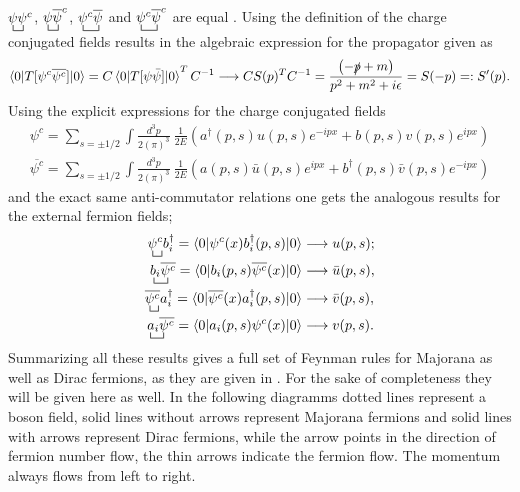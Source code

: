 $\bcontraction{}{\psi}{}{\psi}\psi \psi^c$, $\bcontraction{}{\psi}{}{\psi}\psi \overline{\psi}^c$, $\bcontraction{}{\psi}{^c}{\psi}\psi^c \overline{\psi}$ and $\bcontraction{}{\psi}{^c}{\psi}\psi^c \overline{\psi}^c$ are equal \cite[p. 473]{Denner:1992vza}.
Using the definition of the charge conjugated fields results in the algebraic expression for the propagator given as \cite[Eq. (2.15)]{Denner:1992vza}
\begin{equation*}
	\braket{0|T[\psi^c\overline{\psi^c}]|0}=C\braket{0|T[\psi\bar{\psi}]|0}^TC^{-1}\longrightarrow CS(p)^TC^{-1}=\frac{\left(-\slashed p+m\right)}{p^2+m^2+i\epsilon}=S(-p)=:S'(p).
\end{equation*}
Using the explicit expressions for the charge conjugated fields
\begin{align*}
\psi^c=\sum_{s=\pm1/2}\int \frac{d^3p}{2(\pi)^3}\:\frac{1}{2E}\left(a^\dagger(p,s)u(p,s)e^{-ipx}+b(p,s)v(p,s)e^{ipx}\right)\\
\overline{\psi^c}=\sum_{s=\pm1/2}\int \frac{d^3p}{2(\pi)^3}\:\frac{1}{2E}\left(a(p,s)\bar{u}(p,s)e^{ipx}+b^\dagger(p,s)\bar{v}(p,s)e^{-ipx}\right)
\end{align*}
 and the exact same anti-commutator relations one gets the analogous results for the external fermion fields;
\begin{align*}
\bcontraction{}{\psi}{}{a}\psi^c b_i^\dagger=\braket{0|\psi^c(x) b_i^\dagger(p,s)|0}&\longrightarrow u(p,s); \\
\bcontraction{}{a}{{}_i}{\bar{\psi}}b_i\overline{\psi^c}=\braket{0|b_i(p,s)\overline{\psi^c}(x)|0}&\longrightarrow \bar{u}(p,s) ,\\
\bcontraction{}{\bar{\psi}}{}{b}\overline{\psi^c} a_i^\dagger=\braket{0|\overline{\psi^c}(x) a_i^\dagger(p,s)|0}&\longrightarrow \bar{v}(p,s),\\
\bcontraction{}{b}{{}_i}{\psi}a_i\overline{\psi^c}=\braket{0|a_i(p,s)\psi^c(x)|0}&\longrightarrow v(p,s).
\end{align*}
Summarizing all these results gives a full set of Feynman rules for Majorana as well as Dirac fermions, as they are given in \cite{Denner:1992vza}. For the sake of completeness they will be given here as well. In the following diagramms dotted lines represent a boson field, solid lines without arrows represent Majorana fermions and solid lines with arrows represent Dirac fermions, while the arrow points in the direction of fermion number flow, the thin arrows indicate the fermion flow. The momentum always flows from left to right. 
